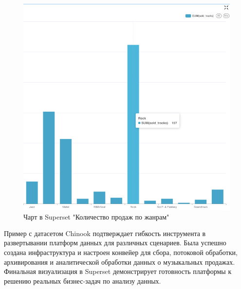 \begin{enumerate}[1.]
\begin{itemize}
\begin{figure}[h]
                        \includegraphics [scale=0.5] {my_folder/images/ex2_superset_chart}
                        \caption{Чарт в Superset "Количество продаж по жанрам"}
                        \label{fig:ex2_superset_chart}
                    \end{figure}
                    \FloatBarrier
          \end{itemize}
\end{enumerate}

Пример с датасетом Chinook подтверждает гибкость инструмента в развертывании платформ данных для различных сценариев. Была успешно создана инфраструктура и настроен конвейер для сбора, потоковой обработки, архивирования и аналитической обработки данных о музыкальных продажах. Финальная визуализация в Superset демонстрирует готовность платформы к решению реальных бизнес-задач по анализу данных.











%
